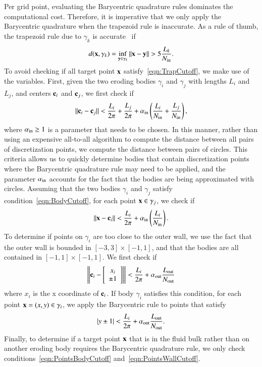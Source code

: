 \documentclass[preprint, 10pt]{elsarticle}
\begin{document}
Per grid point, evaluating the Barycentric quadrature rules dominates
the computational cost. Therefore, it is imperative that we only apply
the Barycentric quadrature when the trapezoid rule is inaccurate.  As a
rule of thumb, the trapezoid rule due to $\gamma_k$ is
accurate~\cite{bar2014} if
\begin{align}
  \label{eqn:TrapCutoff}
  d({\mathbf{x}},\gamma_k) = \inf_{{\mathbf{y}} \in \gamma_k} \|{\mathbf{x}} - {\mathbf{y}}\| > 
    5 \frac{L_k}{N_{\mathrm{in}}}.
\end{align}
To avoid checking if all target point ${\mathbf{x}}$
satisfy~\eqref{eqn:TrapCutoff}, we make use of the {\thL} variables.
First, given the two eroding bodies $\gamma_i$ and $\gamma_j$ with
lengths $L_i$ and $L_j$, and centers ${\mathbf{c}}_i$ and ${\mathbf{c}}_j$, we first check
if
\begin{align}
  \label{eqn:BodyCutoff}
  \|{\mathbf{c}}_i - {\mathbf{c}}_j\| < \frac{L_i}{2\pi} + \frac{L_j}{2\pi} + 
    \alpha_{\mathrm{in}} \left(\frac{L_i}{N_{\mathrm{in}}} + \frac{L_j}{N_{\mathrm{in}}} \right),
\end{align}
where $\alpha_{\mathrm{in}} \geq 1$ is a parameter that needs to be chosen.  In
this manner, rather than using an expensive all-to-all algorithm to
compute the distance between all pairs of discretization points, we
compute the distance between pairs of circles.  This criteria allows us
to quickly determine bodies that contain discretization points where the
Barycentric quadrature rule may need to be applied, and the parameter
$\alpha_{\mathrm{in}}$ accounts for the fact that the bodies are being
approximated with circles.  Assuming that the two bodies $\gamma_i$ and
$\gamma_j$ satisfy condition~\eqref{eqn:BodyCutoff}, for each point ${\mathbf{x}}
\in \gamma_j$, we check if
\begin{align}
  \label{eqn:PointsBodyCutoff}
  \|{\mathbf{x}} - {\mathbf{c}}_i\| < \frac{L_i}{2\pi}
+ \alpha_{\mathrm{in}} \left(\frac{L_i}{N_{\mathrm{in}}} \right).
\end{align}
To determine if points on $\gamma_i$ are too close to the outer wall, we
use the fact that the outer wall is bounded in $[-3,3] \times [-1,1]$,
and that the bodies are all contained in $[-1,1] \times [-1,1]$.  We
first check if
\begin{align}
  \left\|{\mathbf{c}}_i - \left[
    \begin{array}{c}
      x_i \\ \pm 1
    \end{array}
    \right]
  \right\| < \frac{L_i}{2 \pi} + \alpha_{\mathrm{out}} \frac{L_{\mathrm{out}}}{N_{\mathrm{out}}}
\end{align}
where $x_i$ is the x coordinate of ${\mathbf{c}}_i$. If body $\gamma_i$ satisfies
this condition, for each point ${\mathbf{x}}=(x,y) \in \gamma_i$, we apply the
Barycentric rule to points that satisfy
\begin{align}
  \label{eqn:PointsWallCutoff}
  |y \pm 1| < \frac{L_i}{2 \pi} +\alpha_{\mathrm{out}} \frac{L_{\mathrm{out}}}{N_{\mathrm{out}}}.
\end{align}
Finally, to determine if a target point ${\mathbf{x}}$ that is in the fluid bulk
rather than on another eroding body requires the Barycentric quadrature
rule, we only check conditions~\eqref{eqn:PointsBodyCutoff}
and~\eqref{eqn:PointsWallCutoff}.  
\end{document}
